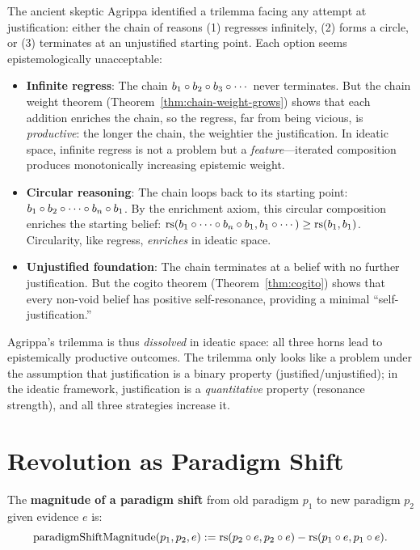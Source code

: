 \begin{remark}
The ancient skeptic Agrippa identified a trilemma facing any attempt at
justification: either the chain of reasons (1) regresses infinitely, (2) forms
a circle, or (3) terminates at an unjustified starting point. Each option seems
epistemologically unacceptable:

\begin{itemize}
\item \textbf{Infinite regress}: The chain $b_1 \circ b_2 \circ b_3 \circ
  \cdots$ never terminates. But the chain weight theorem
  (Theorem~\ref{thm:chain-weight-grows}) shows that each addition enriches the
  chain, so the regress, far from being vicious, is \emph{productive}: the
  longer the chain, the weightier the justification. In ideatic space, infinite
  regress is not a problem but a \emph{feature}---iterated composition produces
  monotonically increasing epistemic weight.
\item \textbf{Circular reasoning}: The chain loops back to its starting point:
  $b_1 \circ b_2 \circ \cdots \circ b_n \circ b_1$. By the
  enrichment axiom, this circular composition enriches the starting belief:
  $\mathrm{rs}(b_1 \circ \cdots \circ b_n \circ b_1, b_1 \circ \cdots) \geq
  \mathrm{rs}(b_1, b_1)$. Circularity, like regress, \emph{enriches} in ideatic space.
\item \textbf{Unjustified foundation}: The chain terminates at a belief with
  no further justification. But the cogito theorem
  (Theorem~\ref{thm:cogito}) shows that every non-void belief has positive
  self-resonance, providing a minimal ``self-justification.''
\end{itemize}

Agrippa's trilemma is thus \emph{dissolved} in ideatic space: all three horns
lead to epistemically productive outcomes. The trilemma only looks like a problem
under the assumption that justification is a binary property (justified/unjustified);
in the ideatic framework, justification is a \emph{quantitative} property (resonance
strength), and all three strategies increase it.
\end{remark}


\section{Revolution as Paradigm Shift}

\begin{definition}
\label{def:paradigm-shift}
The \textbf{magnitude of a paradigm shift} from old paradigm $p_1$ to new
paradigm $p_2$ given evidence $e$ is:
\[
  \mathrm{paradigmShiftMagnitude}(p_1, p_2, e) := \mathrm{rs}(p_2 \circ e, p_2 \circ e) - \mathrm{rs}(p_1 \circ e, p_1 \circ e).
\]
\end{definition}

